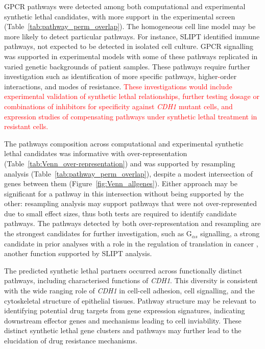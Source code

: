 \gls{GPCR} \glspl{pathway} were detected among both computational and experimental \gls{synthetic lethal} candidates, with more support in the experimental screen (Table~\ref{tab:pathway_perm_overlap}). The homogeneous cell line model may be more likely to detect particular \glspl{pathway}. For instance, \gls{SLIPT} identified immune \glspl{pathway}, not expected to be detected in isolated cell culture. \gls{GPCR} signalling was supported in experimental models \cite{Telford2015} with some of these \glspl{pathway} replicated in varied genetic backgrounds of patient samples. These \glspl{pathway} require further investigation such as identification of more specific \glspl{pathway}, higher\textcolor{red}{-}order interactions, and modes of resistance. \textcolor{red}{These investigations would include experimental validation of synthetic lethal relationships, further testing dosage or combinations of inhibitors for specificity against \textit{CDH1} mutant cells, and expression studies of compensating pathways under synthetic lethal treatment in resistant cells.}

The \glspl{pathway} composition across computational and experimental \gls{synthetic lethal} candidates was informative with over-represent\-ation (Table~\ref{tab:Venn_over-representation}) and was supported by resampling analysis (Table~\ref{tab:pathway_perm_overlap}), despite a modest intersection of genes between them (Figure~\ref{fig:Venn_allgenes}).
Either approach may be significant for a \gls{pathway} in this intersection without being supported by the other: resampling analysis may support \glspl{pathway} that were not over-represent\-ed due to small effect sizes, thus both tests are required to identify candidate \glspl{pathway}.
The \glspl{pathway} detected by both over-represent\-ation and resampling are the strongest candidates for further investigation, such as G$_{\alpha s}$ signalling, a strong candidate in prior analyses with a role in the regulation of translation in cancer \cite{Gao2015}, another function supported by \gls{SLIPT} analysis.

The predicted \gls{synthetic lethal} partners occurred across functionally distinct \glspl{pathway}, including characterised functions of \textit{CDH1}. This diversity is consistent with the wide ranging role of \textit{CDH1} in cell-cell adhesion, cell signalling, and the cytoskeletal structure of epithelial tissues. Pathway structure may be relevant to identifying potential drug targets from \gls{gene expression} signatures, indicating downstream effector genes and mechanisms leading to cell inviability. These distinct \gls{synthetic lethal} gene clusters and \glspl{pathway} may further lead to the elucidation of drug resistance mechanisms.

